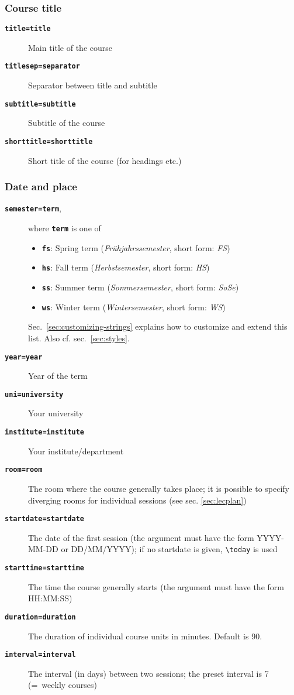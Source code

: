\documentclass[english]{article}
\newcommand*\joption[1]{\textbf{\texttt{#1}}}
\newcommand*\jfmacro[1]{\texttt{#1}}
\newcommand*\jfcsmacro[1]{\jfmacro{\textbackslash{#1}}}
\newcommand*\jparam[1]{\angus #1\angud}
\begin{document}
\subsubsection{Course title}
\begin{description}
\item [\joption{title=\jparam{title}}] Main title of the course
\item [\joption{titlesep=\jparam{separator}}] Separator between title and subtitle
\item [\joption{subtitle=\jparam{subtitle}}] Subtitle of the course
\item [\joption{shorttitle=\jparam{shorttitle}}] Short title of the course (for headings etc.)
\end{description}

\subsubsection{Date and place\label{sec:date-and-place}}
\begin{description}
\item [\joption{semester=\jparam{term}},] where \joption{\jparam{term}} is one of

\begin{itemize}
\item \joption{fs}: Spring term (\emph{Frühjahrssemester}, short form: \emph{FS})
\item \joption{hs}: Fall term (\emph{Herbstsemester}, short form: \emph{HS})
\item \joption{ss}: Summer term (\emph{Sommersemester}, short form: \emph{SoSe})
\item \joption{ws}: Winter term (\emph{Wintersemester}, short form: \emph{WS})
\end{itemize}
Sec.~\ref{sec:customizing-strings} explains how to customize and extend this list.
Also cf. sec.~\ref{sec:styles}.

\item [\joption{year=\jparam{year}}] Year of the term
\item [\joption{uni=\jparam{university}}] Your university
\item [\joption{institute=\jparam{institute}}] Your institute/department
\item [\joption{room=\jparam{room}}] The room where the course generally takes place;
      it is possible to specify diverging rooms for individual sessions
      (see sec. \ref{sec:lecplan})
\item [\joption{startdate=\jparam{startdate}}] The date of the first session (the argument
       must have the form YYYY-MM-DD or DD/MM/YYYY); if no startdate is given,
      \jfcsmacro{today} is used
\item [\joption{starttime=\jparam{starttime}}] The time the course generally starts (the argument
      must have the form HH:MM:SS)
\item [\joption{duration=\jparam{duration}}] The duration of individual course units in minutes.
      Default is 90.
\item [\joption{interval=\jparam{interval}}] The interval (in days) between two sessions;
      the preset interval is 7 (=~weekly courses)
\end{description}
\end{document}
